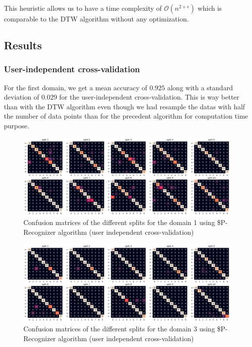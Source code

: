 This heuristic allows us to have a time complexity of $\mathcal{O}(n^{2 + \epsilon})$ which is comparable to the DTW algorithm without any optimization.

\subsection{Results}

\subsubsection{User-independent cross-validation}

For the first domain, we get a mean accuracy of $0.925$ along with a standard deviation of $0.029$ for the user-independent cross-validation. This is way better than with the DTW algorithm even though we had resample the datas with half the number of data points than for the precedent algorithm for computation time purpose.

\begin{figure}[H]
	\centering
	\includegraphics{figures/pcr/domain01/cm_pcr_d1_uindep.png}
	\caption{Confusion matrices of the different splits for the domain 1 using \$P-Recognizer algorithm (user independent cross-validation)}
	\label{fig:cm-pcr-d1-uindep}
\end{figure}

\begin{figure}[H]
	\centering
	\includegraphics{figures/pcr/domain03/cm_pcr_d3_uindep.png}
	\caption{Confusion matrices of the different splits for the domain 3 using \$P-Recognizer algorithm (user independent cross-validation)}
	\label{fig:cm-pcr-d3-uindep}
\end{figure}

